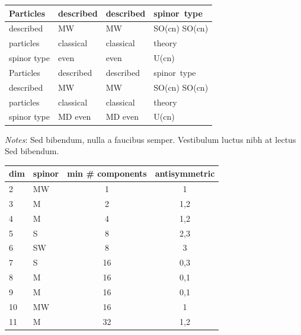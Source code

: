\begin{table}[!t] %
{\begin{tabular*}{348pt}{@{\extracolsep{\fill}}llll}\toprule
Particles   & described & described & spinor~type \\\midrule
described   & MW        & MW        & SO(cn) SO(cn)\\
particles   & classical & classical & theory\\
spinor type & even      & even      & U(cn)\\
Particles   & described & described & spinor~type \\
described   & MW        & MW        & SO(cn) SO(cn)\\
particles   & classical & classical & theory\\
spinor type &MD even    &MD even    & U(cn)\\\bottomrule
\end{tabular*}}{\textit{Notes}: Sed bibendum, nulla a faucibus semper. Vestibulum luctus nibh at lectus Sed bibendum.}
\end{table}


\lipsum[5]
\lipsum[5]


\lipsum[5]
\lipsum[5]

\begin{table}%
{\begin{tabular*}{500pt}{@{\extracolsep{\fill}}llcc}\toprule
\multicolumn{1}{l}{dim} & spinor & min \# components & antisymmetric \\\midrule
 2 & MW & 1 & 1 \\
 3 & M & 2 & 1,2 \\
 4 & M & 4 & 1,2 \\
 5 & S & 8 & 2,3 \\
 6 & SW & 8 & 3 \\
 7 & S & 16 & 0,3 \\
 8 & M & 16 & 0,1 \\
 9 & M & 16 & 0,1 \\
 10 & MW & 16 & 1 \\
 11 & M & 32 & 1,2 \\\bottomrule
\end{tabular*}}{}
\end{table}


